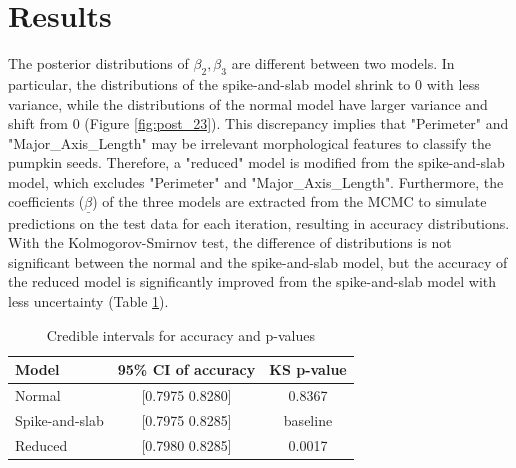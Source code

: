 \documentclass[12pt]{article}
\begin{document}
\section{Results}
The posterior distributions of $\beta_2,\beta_3$ are different between two models. In particular, the distributions of the spike-and-slab model shrink to 0 with less variance, while the distributions of the normal model have larger variance and shift from 0 (Figure \ref{fig:post_23}). This discrepancy implies that "Perimeter" and "Major\_Axis\_Length" may be irrelevant morphological features to classify the pumpkin seeds. Therefore, a "reduced" model is modified from the spike-and-slab model, which excludes "Perimeter" and "Major\_Axis\_Length". Furthermore, the coefficients ($\underline\beta$) of the three models are extracted from the MCMC to simulate predictions on the test data for each iteration, resulting in accuracy distributions. With the Kolmogorov-Smirnov test, the difference of distributions is not significant between the normal and the spike-and-slab model, but the accuracy of the reduced model is significantly improved from the spike-and-slab model with less uncertainty (Table \ref{tab:ci_acc}). 

\begin{table}[ht]
\centering
\begin{tabular}{lc|c}
\hline
\textbf{Model} & \textbf{95\% CI of accuracy} & \textbf{KS p-value}\\
\hline
Normal & [0.7975 0.8280] &  0.8367 \\
Spike-and-slab & [0.7975 0.8285] & baseline \\
Reduced & [0.7980 0.8285] & 0.0017 \\
\hline
\end{tabular}
\caption{Credible intervals for accuracy and p-values}
\label{tab:ci_acc}
\end{table}
\end{document}
